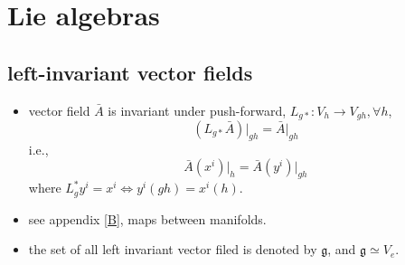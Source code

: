 \chapter{Lie algebras}
\section{left-invariant vector fields}
\begin{itemize}
	\item vector field $\bar{A}$ is invariant under push-forward, $L_{g *}: V_h \rightarrow V_{g h}, \forall h$,
	\begin{equation}
		(L_{g *} \bar{A}) \big|_{g h} = \bar{A} \big|_{g h}
	\end{equation}
	i.e.,
	\begin{equation}
		\bar{A}(x^i) \big|_h = \bar{A}(y^i) \big|_{g h}
	\end{equation}
	where $L_g^* y^i = x^i \iff y^i(g h) = x^i(h)$.
	
	\item see appendix \ref{B}, maps between manifolds.
	
	\item the set of all left invariant vector filed is denoted by $\mathfrak{g}$, and $\mathfrak{g} \simeq V_e$.
\end{itemize}

